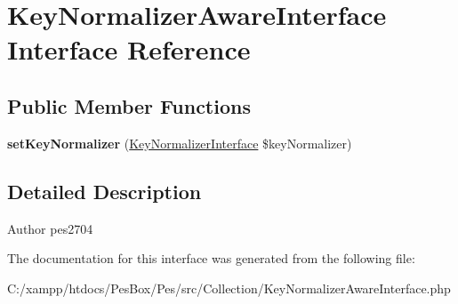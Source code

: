 \hypertarget{interface_pes_1_1_collection_1_1_key_normalizer_aware_interface}{}\section{Key\+Normalizer\+Aware\+Interface Interface Reference}
\label{interface_pes_1_1_collection_1_1_key_normalizer_aware_interface}
\subsection*{Public Member Functions}
\begin{DoxyCompactItemize}
\item 
\mbox{\label{interface_pes_1_1_collection_1_1_key_normalizer_aware_interface_a983fc207bb5128ebf30ee156fbbb77d7}} 
{\bfseries set\+Key\+Normalizer} (\mbox{\hyperlink{interface_pes_1_1_collection_1_1_normalizer_1_1_key_normalizer_interface}{Key\+Normalizer\+Interface}} \$key\+Normalizer)
\end{DoxyCompactItemize}


\subsection{Detailed Description}
\begin{DoxyAuthor}{Author}
pes2704 
\end{DoxyAuthor}


The documentation for this interface was generated from the following file\+:\begin{DoxyCompactItemize}
\item 
C\+:/xampp/htdocs/\+Pes\+Box/\+Pes/src/\+Collection/Key\+Normalizer\+Aware\+Interface.\+php\end{DoxyCompactItemize}
